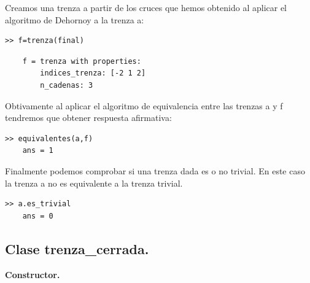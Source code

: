 Creamos una trenza a partir de los cruces que hemos obtenido al aplicar el algoritmo de Dehornoy a la trenza a:
\begin{lstlisting}
>> f=trenza(final)
\end{lstlisting}
\begin{lstlisting}
	f = trenza with properties:
	    indices_trenza: [-2 1 2]
	    n_cadenas: 3
\end{lstlisting}

Obtivamente al aplicar el algoritmo de equivalencia entre las trenzas a y f tendremos que obtener respuesta afirmativa:
\begin{lstlisting}
>> equivalentes(a,f)
	ans = 1
\end{lstlisting}

Finalmente podemos comprobar si una trenza dada es o no trivial. En este caso la trenza a no es equivalente a la trenza trivial. 
\begin{lstlisting}
>> a.es_trivial
	ans = 0
\end{lstlisting}

\subsection{Clase trenza\_cerrada.}

\begin{center}
	\textbf{Constructor.}
\end{center}
